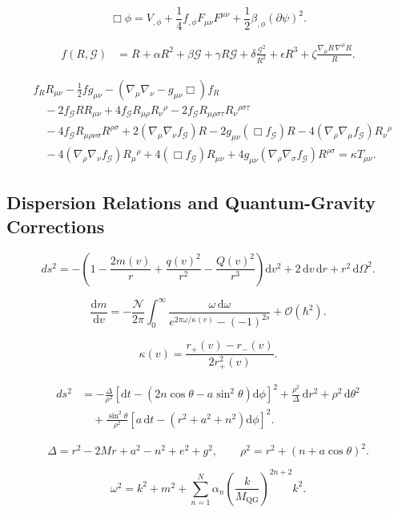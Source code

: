 \documentclass[11pt,a4paper]{article}
\newcommand{\G}{\mathcal{G}}
\newcommand{\N}{\mathcal{N}}
\newcommand{\dd}{\mathrm{d}}
\begin{document}
\[
\Box\phi=V_{,\phi}+\frac14 f_{,\phi}F_{\mu\nu}F^{\mu\nu}
+\frac12\beta_{,\phi}(\partial\psi)^2 .
\]

\begin{align*}
f(R,\G)
&=R+\alpha R^2+\beta\G+\gamma R\G
 +\delta\frac{\G^2}{R^2}+\epsilon R^3
 +\zeta\frac{\nabla_\mu R\,\nabla^\mu R}{R}.
\end{align*}

\begin{align*}
&f_R R_{\mu\nu}-\frac12 f g_{\mu\nu}
-\left(\nabla_\mu\nabla_\nu-g_{\mu\nu}\Box\right)f_R\\
&\quad-2f_{\G}RR_{\mu\nu}
+4f_{\G}R_{\mu\rho}R_\nu{}^{\rho}
-2f_{\G}R_{\mu\rho\sigma\tau}R_\nu{}^{\rho\sigma\tau}\\
&\quad-4f_{\G}R_{\mu\rho\nu\sigma}R^{\rho\sigma}
+2\left(\nabla_\mu\nabla_\nu f_{\G}\right)R
-2g_{\mu\nu}\left(\Box f_{\G}\right)R
-4\left(\nabla_\rho\nabla_\mu f_{\G}\right)R_\nu{}^{\rho}\\
&\quad-4\left(\nabla_\rho\nabla_\nu f_{\G}\right)R_\mu{}^{\rho}
+4\left(\Box f_{\G}\right)R_{\mu\nu}
+4g_{\mu\nu}\left(\nabla_\rho\nabla_\sigma f_{\G}\right)R^{\rho\sigma}
=\kappa T_{\mu\nu}.
\end{align*}

\subsection{Dispersion Relations and Quantum-Gravity Corrections}

\[
ds^2=-\left(1-\frac{2m(v)}{r}+\frac{q(v)^2}{r^2}
-\frac{Q(v)^2}{r^3}\right)\dd v^2
+2\,\dd v\,\dd r+r^2\,\dd\Omega^2.
\]

\[
\frac{\dd m}{\dd v}
=-\frac{\N}{2\pi}\int_0^\infty
\frac{\omega\,\dd\omega}{e^{2\pi\omega/\kappa(v)}-(-1)^{2s}}
+\mathcal{O}(\hbar^2).
\]

\[
\kappa(v)=\frac{r_+(v)-r_-(v)}{2r_+^2(v)}.
\]

\begin{align*}
ds^2
&=-\frac{\Delta}{\rho^2}
\left[\dd t-\left(2n\cos\theta-a\sin^2\theta\right)\dd\phi\right]^2
+\frac{\rho^2}{\Delta}\,\dd r^2+\rho^2\,\dd\theta^2\\
&\quad+\frac{\sin^2\theta}{\rho^2}
\left[a\,\dd t-\left(r^2+a^2+n^2\right)\dd\phi\right]^2 .
\end{align*}

\[
\Delta=r^2-2Mr+a^2-n^2+e^2+g^2,\qquad
\rho^2=r^2+(n+a\cos\theta)^2.
\]

\[
\omega^2=k^2+m^2+\sum_{n=1}^{N}\alpha_n
\left(\frac{k}{M_{\mathrm{QG}}}\right)^{2n+2}k^2 .
\]
\end{document}
